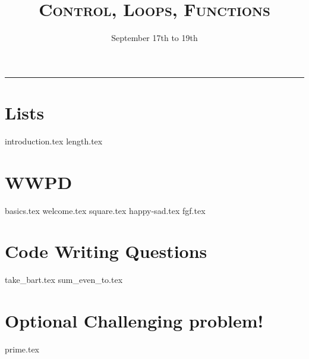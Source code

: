 \documentclass{exam}
\title{\textsc{Control, Loops, Functions}}
\date{September 17th to 19th}
\begin{document}
\maketitle
\rule{\textwidth}{0.15em}
\fontsize{12}{15}\selectfont


\section{Lists}
\begin{questions}
{introduction.tex}
{length.tex}
\newpage
\section{WWPD}
{basics.tex}
\newpage
{welcome.tex}
\vspace{5em}
{square.tex}
\newpage
{happy-sad.tex}
\vspace{5em}
{fgf.tex}

\newpage
\section{Code Writing Questions}
{take_bart.tex}
{sum_even_to.tex}
\newpage
\section{Optional Challenging problem!}
{prime.tex}



\end{questions}
\end{document}
